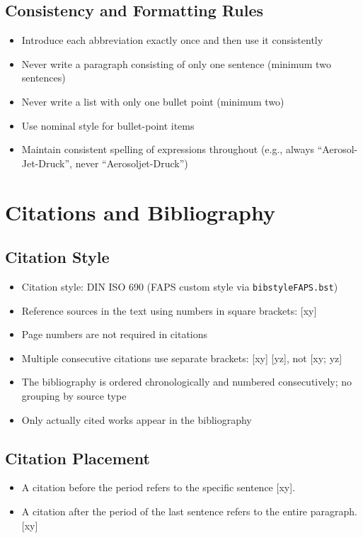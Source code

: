 \subsection{Consistency and Formatting Rules}
\begin{itemize}
    \item Introduce each abbreviation exactly once and then use it consistently
    \item Never write a paragraph consisting of only one sentence (minimum two sentences)
    \item Never write a list with only one bullet point (minimum two)
    \item Use nominal style for bullet-point items
    \item Maintain consistent spelling of expressions throughout (e.g., always ``Aerosol-Jet-Druck'', never ``Aerosoljet-Druck'')
\end{itemize}


\section{Citations and Bibliography}

\subsection{Citation Style}
\begin{itemize}
    \item Citation style: DIN ISO 690 (FAPS custom style via \texttt{bibstyleFAPS.bst})
    \item Reference sources in the text using numbers in square brackets: [xy]
    \item Page numbers are not required in citations
    \item Multiple consecutive citations use separate brackets: [xy] [yz], not [xy; yz]
    \item The bibliography is ordered chronologically and numbered consecutively; no grouping by source type
    \item Only actually cited works appear in the bibliography
\end{itemize}

\subsection{Citation Placement}
\begin{itemize}
    \item A citation before the period refers to the specific sentence [xy].
    \item A citation after the period of the last sentence refers to the entire paragraph. [xy]
\end{itemize}

